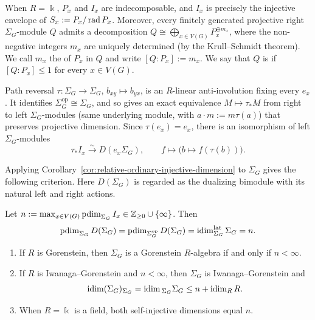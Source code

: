 \documentclass[a4paper,leqno]{amsart}
\begin{document}
When $R=\Bbbk$, $P_x$ and $I_x$ are indecomposable, and $I_x$ is precisely the injective envelope of $S_x:=P_x/\operatorname{rad} P_x$.
Moreover, every finitely generated projective right $\Sigma_G$-module $Q$ admits a decomposition $Q\cong\bigoplus_{x\in V(G)}P_x^{\oplus m_x}$, where the non-negative integers $m_x$ are uniquely determined (by the Krull--Schmidt theorem).  We call $m_x$ the  of $P_x$ in $Q$ and write $[Q:P_x]:=m_x$. We say that $Q$ is  if $[Q:P_x]\leq1$ for every $x\in V(G)$.

Path reversal $\tau\colon\Sigma_G\to\Sigma_G$, $b_{xy}\mapsto b_{yx}$, is an $R$-linear anti-involution fixing every $e_x$. It identifies $\Sigma_G^{\operatorname{op}}\cong\Sigma_G$, and so gives an exact equivalence $M\mapsto\tau_*M$ from right to left $\Sigma_G$-modules (same underlying module, with $a\cdot m:=m\tau(a)$) that preserves projective dimension.
Since $\tau(e_x)=e_x$, there is an isomorphism of left $\Sigma_G$-modules
\begin{equation}
 \tau_*I_x\xrightarrow{\sim}D(e_x\Sigma_G),
 \qquad f\longmapsto\bigl(b\longmapsto f(\tau(b))\bigr).
 \label{eq:tau-canonical-summands}
\end{equation}

Applying Corollary~\ref{cor:relative-ordinary-injective-dimension} to $\Sigma_G$ gives the following criterion. Here $D(\Sigma_G)$ is regarded as the dualizing bimodule with its natural left and right actions.

\begin{cor}\label{cor:distance-gorenstein-criterion}
Let $n:=\max_{x\in V(G)}\operatorname{pdim}_{\Sigma_G}I_x
 \in\mathbb Z_{\geq0}\cup\{\infty\}$. Then
\begin{equation}
 \operatorname{pdim}_{\Sigma_G}D(\Sigma_G)
 =\operatorname{pdim}_{\Sigma_G^{\operatorname{op}}}D(\Sigma_G)
 =\operatorname{idim}^{\operatorname{lat}}_{\Sigma_G}\Sigma_G
 =n.
 \label{eq:distance-canonical-dimensions}
\end{equation}
\begin{enumerate}
    \item If $R$ is Gorenstein, then $\Sigma_G$ is a Gorenstein
$R$-algebra if and only if $n<\infty$.
\item If $R$ is Iwanaga--Gorenstein and $n<\infty$, then $\Sigma_G$ is Iwanaga--Gorenstein and
\[
 \operatorname{idim}(\Sigma_G)_{\Sigma_G}
 =\operatorname{idim}{}_{\Sigma_G}\Sigma_G
 \leq n+\operatorname{idim}_R R.
\]
\item When $R=\Bbbk$ is a field, both self-injective dimensions equal $n$.
\end{enumerate}
\end{cor}
\end{document}
